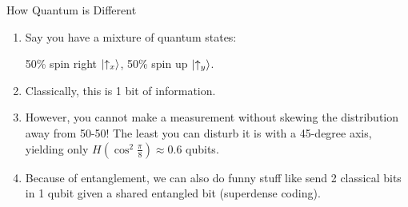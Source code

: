 \documentclass{beamer}
\begin{document}
\begin{frame}{How Quantum is Different}
\begin{enumerate}
    \item Say you have a mixture of quantum states:
    
    50\% spin right $\ket{\uparrow_x}$, 50\% spin up $\ket{\uparrow_y}$.
    \item Classically, this is 1 bit of information.
    \item However, you cannot make a measurement without skewing the distribution away from 50-50! The least you can disturb it is with a 45-degree axis, yielding only $H(\cos^2\frac{\pi}{8})\approx0.6$ qubits. 

    \item Because of entanglement, we can also do funny stuff like send 2 classical bits in 1 qubit given a shared entangled bit (superdense coding).
\end{enumerate}
\end{frame}
\end{document}
